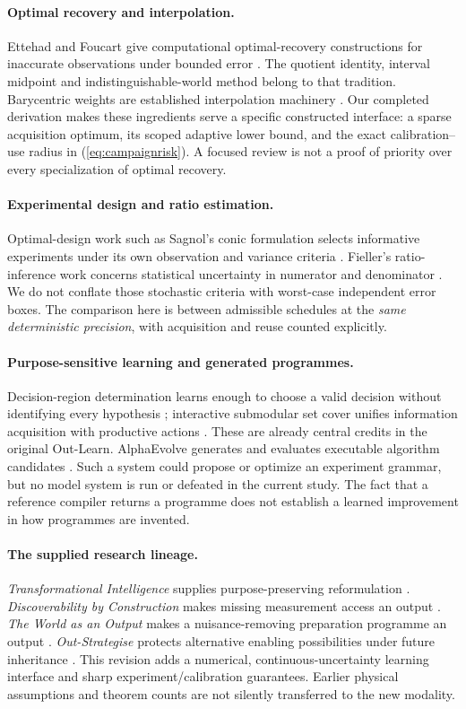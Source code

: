\documentclass[11pt,letterpaper]{article}
\theoremstyle{definition}\newtheorem{definition}[theorem]{Definition}
\theoremstyle{remark}\newtheorem{remark}[theorem]{Remark}
\begin{document}
\paragraph{Optimal recovery and interpolation.}
Ettehad and Foucart give computational optimal-recovery constructions for inaccurate observations under bounded error \cite{ettehad}. The quotient identity, interval midpoint and indistinguishable-world method belong to that tradition. Barycentric weights are established interpolation machinery \cite{berrut}. Our completed derivation makes these ingredients serve a specific constructed interface: a sparse acquisition optimum, its scoped adaptive lower bound, and the exact calibration--use radius in (\ref{eq:campaignrisk}). A focused review is not a proof of priority over every specialization of optimal recovery.

\paragraph{Experimental design and ratio estimation.}
Optimal-design work such as Sagnol's conic formulation selects informative experiments under its own observation and variance criteria \cite{sagnol}. Fieller's ratio-inference work concerns statistical uncertainty in numerator and denominator \cite{fieller}. We do not conflate those stochastic criteria with worst-case independent error boxes. The comparison here is between admissible schedules at the \emph{same deterministic precision}, with acquisition and reuse counted explicitly.

\paragraph{Purpose-sensitive learning and generated programmes.}
Decision-region determination learns enough to choose a valid decision without identifying every hypothesis \cite{javdani}; interactive submodular set cover unifies information acquisition with productive actions \cite{guillory}. These are already central credits in the original Out-Learn. AlphaEvolve generates and evaluates executable algorithm candidates \cite{alphaevolve}. Such a system could propose or optimize an experiment grammar, but no model system is run or defeated in the current study. The fact that a reference compiler returns a programme does not establish a learned improvement in how programmes are invented.

\paragraph{The supplied research lineage.}
\emph{Transformational Intelligence} supplies purpose-preserving reformulation \cite{transform}. \emph{Discoverability by Construction} makes missing measurement access an output \cite{discoverability}. \emph{The World as an Output} makes a nuisance-removing preparation programme an output \cite{world}. \emph{Out-Strategise} protects alternative enabling possibilities under future inheritance \cite{strategise}. This revision adds a numerical, continuous-uncertainty learning interface and sharp experiment/calibration guarantees. Earlier physical assumptions and theorem counts are not silently transferred to the new modality.
\end{document}
